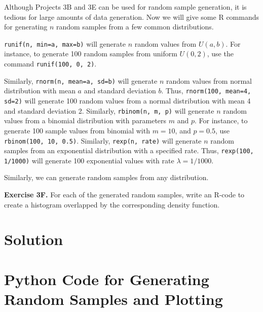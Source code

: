 \documentclass{article}
\begin{document}
Although Projects 3B and 3E can be used for random sample generation, it is tedious for large amounts of data generation. Now we will give some R commands for generating \(n\) random samples from a few common distributions.\newline

\texttt{runif(n, min=a, max=b)} will generate \(n\) random values from \(U(a, b)\). For instance, to generate 100 random samples from uniform \(U(0, 2)\), use the command \texttt{runif(100, 0, 2)}.\newline

Similarly, \texttt{rnorm(n, mean=a, sd=b)} will generate \(n\) random values from normal distribution with mean \(a\) and standard deviation \(b\). Thus, \texttt{rnorm(100, mean=4, sd=2)} will generate 100 random values from a normal distribution with mean 4 and standard deviation 2. Similarly, \texttt{rbinom(n, m, p)} will generate \(n\) random values from a binomial distribution with parameters \(m\) and \(p\). For instance, to generate 100 sample values from binomial with \(m=10\), and \(p=0.5\), use \texttt{rbinom(100, 10, 0.5)}. Similarly, \texttt{rexp(n, rate)} will generate \(n\) random samples from an exponential distribution with a specified rate. Thus, \texttt{rexp(100, 1/1000)} will generate 100 exponential values with rate \(\lambda = 1/1000\). \newline

Similarly, we can generate random samples from any distribution.\newline


\textbf{Exercise 3F.} For each of the generated random samples, write an R-code to create a histogram overlapped by the corresponding density function.

\section*{Solution}



\section*{Python Code for Generating Random Samples and Plotting}
\end{document}
